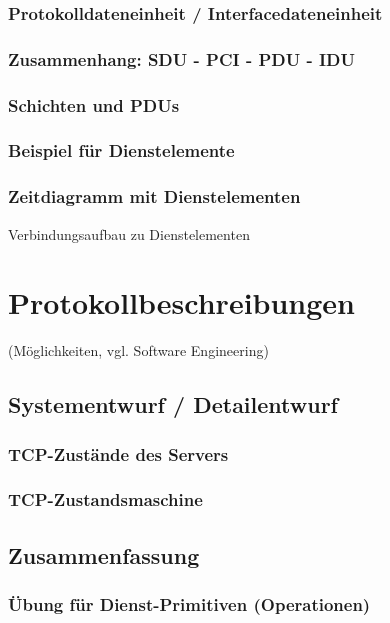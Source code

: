\subsubsection{Protokolldateneinheit / Interfacedateneinheit}
\subsubsection{Zusammenhang: SDU - PCI - PDU - IDU}
\subsubsection{Schichten und PDUs}
\subsubsection{Beispiel für Dienstelemente}
\subsubsection{Zeitdiagramm mit Dienstelementen}
Verbindungsaufbau zu Dienstelementen
\section{Protokollbeschreibungen}
(Möglichkeiten, vgl. Software Engineering)
\subsection{Systementwurf / Detailentwurf}
\subsubsection{TCP-Zustände des Servers}
\subsubsection{TCP-Zustandsmaschine}
\subsection{Zusammenfassung}
\subsubsection{Übung für Dienst-Primitiven (Operationen)}
